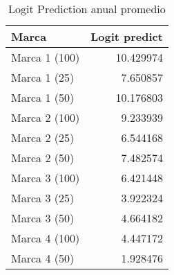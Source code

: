 \begin{table}
\centering
\caption{Logit Prediction anual promedio}
\begin{tabular}{lr}
\toprule
         Marca &  Logit predict \\
\midrule
 Marca 1 (100) &      10.429974 \\
  Marca 1 (25) &       7.650857 \\
  Marca 1 (50) &      10.176803 \\
 Marca 2 (100) &       9.233939 \\
  Marca 2 (25) &       6.544168 \\
  Marca 2 (50) &       7.482574 \\
 Marca 3 (100) &       6.421448 \\
  Marca 3 (25) &       3.922324 \\
  Marca 3 (50) &       4.664182 \\
 Marca 4 (100) &       4.447172 \\
  Marca 4 (50) &       1.928476 \\
\bottomrule
\end{tabular}
\end{table}
